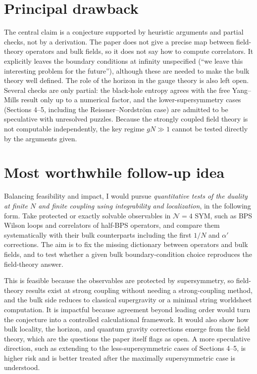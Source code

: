 \documentclass[11pt]{article}
\begin{document}
\section{Principal drawback}
The central claim is a conjecture supported by heuristic arguments and partial checks, not by a derivation. The paper does not give a precise map between field-theory operators and bulk fields, so it does not say how to compute correlators. It explicitly leaves the boundary conditions at infinity unspecified (``we leave this interesting problem for the future''), although these are needed to make the bulk theory well defined. The role of the horizon in the gauge theory is also left open. Several checks are only partial: the black-hole entropy agrees with the free Yang--Mills result only up to a numerical factor, and the lower-supersymmetry cases (Sections 4--5, including the Reissner--Nordstr\"om case) are admitted to be speculative with unresolved puzzles. Because the strongly coupled field theory is not computable independently, the key regime $gN\gg1$ cannot be tested directly by the arguments given.

\section{Most worthwhile follow-up idea}
Balancing feasibility and impact, I would pursue \emph{quantitative tests of the duality at finite $N$ and finite coupling using integrability and localization}, in the following form. Take protected or exactly solvable observables in $\mathcal N=4$ SYM, such as BPS Wilson loops and correlators of half-BPS operators, and compare them systematically with their bulk counterparts including the first $1/N$ and $\alpha'$ corrections. The aim is to fix the missing dictionary between operators and bulk fields, and to test whether a given bulk boundary-condition choice reproduces the field-theory answer.

This is feasible because the observables are protected by supersymmetry, so field-theory results exist at strong coupling without needing a strong-coupling method, and the bulk side reduces to classical supergravity or a minimal string worldsheet computation. It is impactful because agreement beyond leading order would turn the conjecture into a controlled calculational framework. It would also show how bulk locality, the horizon, and quantum gravity corrections emerge from the field theory, which are the questions the paper itself flags as open. A more speculative direction, such as extending to the less-supersymmetric cases of Sections 4--5, is higher risk and is better treated after the maximally supersymmetric case is understood.
\end{document}
